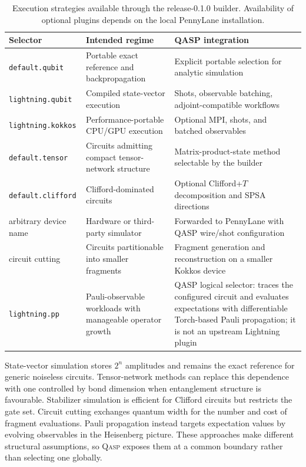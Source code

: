 \documentclass[10pt]{article}
\newcommand{\qasp}{\textsc{Qasp}}
\newcommand{\code}[1]{\texttt{#1}}
\newcommand{\version}{0.1.0}
\begin{document}
\begin{table}[t]
\centering
\caption{Execution strategies available through the release-\version{} builder.  Availability of optional plugins depends on the local PennyLane installation.}
\label{tab:backends}
\small
\begin{tabularx}{\textwidth}{@{}p{}p{}X@{}}
\toprule
Selector & Intended regime & QASP integration \\
\midrule
\code{default.qubit} & Portable exact reference and backpropagation & Explicit portable selection for analytic simulation \\
\code{lightning.qubit} & Compiled state-vector execution & Shots, observable batching, adjoint-compatible workflows \\
\code{lightning.kokkos} & Performance-portable CPU/GPU execution & Optional MPI, shots, and batched observables \\
\code{default.tensor} & Circuits admitting compact tensor-network structure & Matrix-product-state method selectable by the builder \\
\code{default.clifford} & Clifford-dominated circuits & Optional Clifford+$T$ decomposition and SPSA directions \\
arbitrary device name & Hardware or third-party simulator & Forwarded to PennyLane with QASP wire/shot configuration \\
circuit cutting & Circuits partitionable into smaller fragments & Fragment generation and reconstruction on a smaller Kokkos device \\
\code{lightning.pp} & Pauli-observable workloads with manageable operator growth & QASP logical selector: traces the configured circuit and evaluates expectations with differentiable Torch-based Pauli propagation; it is not an upstream Lightning plugin \\
\bottomrule
\end{tabularx}
\end{table}

State-vector simulation stores $2^n$ amplitudes and remains the exact reference for generic noiseless circuits.  Tensor-network methods can replace this dependence with one controlled by bond dimension when entanglement structure is favourable.  Stabilizer simulation is efficient for Clifford circuits but restricts the gate set.  Circuit cutting exchanges quantum width for the number and cost of fragment evaluations.  Pauli propagation instead targets expectation values by evolving observables in the Heisenberg picture.  These approaches make different structural assumptions, so \qasp{} exposes them at a common boundary rather than selecting one globally.
\end{document}
